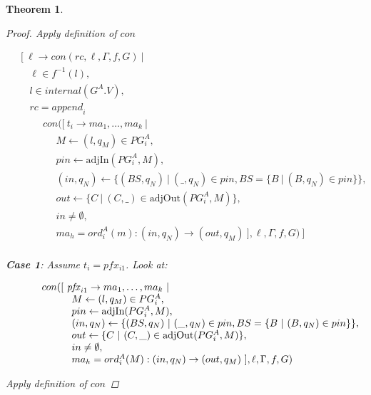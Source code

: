\documentclass[twocolumn, openany]{sig-alternate-10pt}
\newtheorem{thm}{Theorem}
\begin{document}
\begin{thm}
\begin{proof}
  Apply definition of $con$

  \[ \begin{array}{l}
     ~~~~~ [~ \ell \rightarrow con(rc,\ell,\Gamma,f,G) ~\vert~ \\
     ~~~~~~~~~ \ell \in f^{-1}(l), \\
     ~~~~~~~~~ l \in internal(G^A.V), \\
     ~~~~~~~~~ rc = \mathit{append}_i~  \\
     ~~~~~~~~~~~~~~~ con([~ t_i \rightarrow ma_1, \dots, ma_k ~\vert~ \\
     ~~~~~~~~~~~~~~~~~~~~~ M \leftarrow (l,q_M) \in PG^A_i, \\
     ~~~~~~~~~~~~~~~~~~~~~ pin \leftarrow \text{adjIn}(PG^A_i,M), \\
     ~~~~~~~~~~~~~~~~~~~~~ (in,q_N) \leftarrow \{ (BS,q_N) ~\vert~ (\_,q_N) \in pin, BS=\{B ~\vert~ (B,q_N) \in pin \} \}, \\
     ~~~~~~~~~~~~~~~~~~~~~ out \leftarrow \{ C ~\vert~ (C,\_) \in \text{adjOut}(PG^A_i,M) \}, \\
     ~~~~~~~~~~~~~~~~~~~~~ in \neq \emptyset, \\
     ~~~~~~~~~~~~~~~~~~~~~ ma_h = ord^A_i(m) : (in,q_N) \rightarrow (out,q_M) ~],\ell,\Gamma,f,G) ~] \\
  \end{array} \]%

  \vspace{1em}
  \textbf{Case 1}: Assume $t_i = pfx_{i1}$. Look at:

  \[ \begin{array}{l}
     ~~~~~~~~~ con([~ \mathit{pfx}_{i1} \rightarrow ma_1, \dots, ma_k ~\vert~ \\
     ~~~~~~~~~~~~~~~~~~ M \leftarrow (l,q_M) \in PG^A_i, \\
     ~~~~~~~~~~~~~~~~~~ pin \leftarrow \text{adjIn}(PG^A_i,M), \\
     ~~~~~~~~~~~~~~~~~~ (in,q_N) \leftarrow \{ (BS,q_N) ~\vert~ (\_,q_N) \in pin, BS=\{B ~\vert~ (B,q_N) \in pin \} \}, \\
     ~~~~~~~~~~~~~~~~~~ out \leftarrow \{ C ~\vert~ (C,\_) \in \text{adjOut}(PG^A_i,M) \}, \\
     ~~~~~~~~~~~~~~~~~~ in \neq \emptyset, \\
     ~~~~~~~~~~~~~~~~~~ ma_h = ord^A_i(M) : (in,q_N) \rightarrow (out,q_M) ~],\ell,\Gamma,f,G) \\
  \end{array} \]%

  Apply definition of $con$


\end{proof}
\end{thm}
\end{document}
